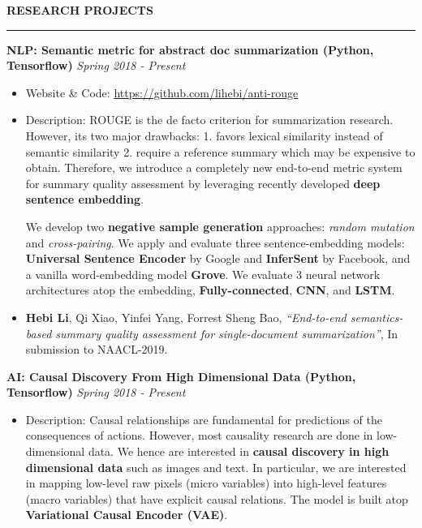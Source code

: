 \documentclass[10pt,letterpaper]{article}
\newenvironment{mysection}[1]{ %
  \medskip
  \MakeUppercase{\bf #1}
  \medskip
  \hrule
  \medskip
  \begin{list}{}{
      \setlength{\leftmargin}{1.5em}
    }
  \item[]
}{
  \end{list}
}
\begin{document}
\begin{mysection}{Research Projects}

  \textbf{NLP: Semantic metric for abstract doc summarization (Python,
    Tensorflow)} \hfill \emph{Spring 2018 - Present}
  \begin{itemize}
  \item Website \& Code: \url{https://github.com/lihebi/anti-rouge}
  \item Description: ROUGE is the de facto criterion for summarization
    research.  However, its two major drawbacks: 1. favors lexical
    similarity instead of semantic similarity 2. require a reference
    summary which may be expensive to obtain.  Therefore, we introduce
    a completely new end-to-end metric system for summary quality
    assessment by leveraging recently developed \textbf{deep sentence
      embedding}.

    We develop two \textbf{negative sample generation} approaches:
    \textit{random mutation} and \textit{cross-pairing}.  We apply and
    evaluate three sentence-embedding models: \textbf{Universal
      Sentence Encoder} by Google and \textbf{InferSent} by Facebook,
    and a vanilla word-embedding model \textbf{Grove}. We evaluate 3
    neural network architectures atop the embedding,
    \textbf{Fully-connected}, \textbf{CNN}, and \textbf{LSTM}.

  \item \textbf{Hebi Li}, Qi Xiao, Yinfei Yang, Forrest Sheng Bao,
    \textit{``End-to-end semantics-based summary quality assessment
      for single-document summarization''}, In submission to
    NAACL-2019.
  \end{itemize}
  
  \textbf{AI: Causal Discovery From High Dimensional Data (Python,
    Tensorflow)} \hfill \emph{Spring 2018 - Present}

  \begin{itemize}
  \item Description: Causal relationships are fundamental for
    predictions of the consequences of actions. However, most
    causality research are done in low-dimensional data. We hence are
    interested in \textbf{causal discovery in high dimensional data}
    such as images and text. In particular, we are interested in
    mapping low-level raw pixels (micro variables) into high-level
    features (macro variables) that have explicit causal relations.
    The model is built atop \textbf{Variational Causal Encoder (VAE)}.
  \end{itemize}
  

\end{mysection}
\end{document}
